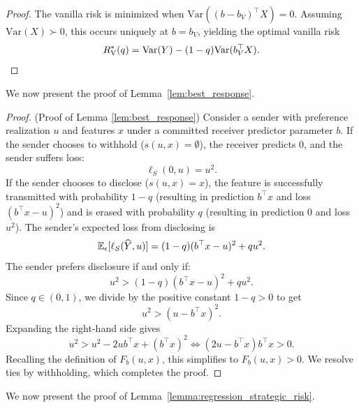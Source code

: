 \begin{proof}
The vanilla risk is minimized when $\mathrm{Var}((b - b_V)^\top X) = 0$. Assuming $\mathrm{Var}(X) \succ 0$, this occurs uniquely at $b = b_V$, yielding the optimal vanilla risk
\begin{equation*}
    R_{\mathrm{V}}^*(q) = \mathrm{Var}(Y) - (1 - q)\mathrm{Var}(b_V^\top X).
\end{equation*}
\end{proof}

We now present the proof of Lemma~\ref{lem:best_response}.

\begin{proof}(Proof of Lemma \ref{lem:best_response})\label{proof:best_response}\label{app:proof_best_response}
Consider a sender with preference realization $u$ and features $x$ under a committed receiver predictor parameter $b$. 
If the sender chooses to withhold ($s(u,x) = \emptyset$), the receiver predicts $0$, and the sender suffers loss:
\begin{equation*}
    \ell_S(0, u) = u^2.
\end{equation*}
If the sender chooses to disclose ($s(u,x) = x$), the feature is successfully transmitted with probability $1 - q$ (resulting in prediction $b^\top x$ and loss $(b^\top x - u)^2$) and is erased with probability $q$ (resulting in prediction $0$ and loss $u^2$). The sender's expected loss from disclosing is
\begin{equation*}
    \mathbb{E}_{\epsilon}[\ell_S(\widehat{Y}, u)] = (1 - q)(b^\top x - u)^2 + q u^2.
\end{equation*}
The sender prefers disclosure if and only if:
\begin{equation*}
    u^2 > (1 - q)(b^\top x - u)^2 + q u^2.
\end{equation*}
Since $q \in (0, 1)$, we divide by the positive constant $1 - q > 0$ to get
\begin{equation*}
    u^2 > (u - b^\top x)^2.
\end{equation*}
Expanding the right-hand side gives
\begin{equation*}
    u^2 > u^2 - 2u b^\top x + (b^\top x)^2 \iff (2u - b^\top x)b^\top x > 0.
\end{equation*}
Recalling the definition of $F_b(u, x)$, this simplifies to $F_b(u, x) > 0$. We resolve ties by withholding, which completes the proof.
\end{proof}

We now present the proof of Lemma~\ref{lemma:regression_strategic_risk}.

